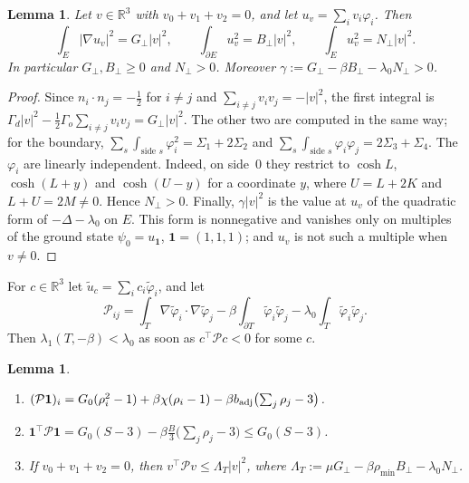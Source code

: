 \documentclass[11pt]{article}
\newtheorem{lemma}[theorem]{Lemma}
\theoremstyle{remark}
\newcommand{\R}{\mathbb{R}}
\newcommand{\E}{E}
\newcommand{\one}{\mathbf 1}
\newcommand{\Gp}{G_{\perp}}
\newcommand{\Bp}{B_{\perp}}
\newcommand{\Np}{N_{\perp}}
\begin{document}
\begin{lemma}\label{lem:vperp}
Let $v\in\R^3$ with $v_0+v_1+v_2=0$, and let $u_v=\sum_iv_i\varphi_i$. Then
\[
  \int_\E|\nabla u_v|^2=\Gp|v|^2,\qquad \int_{\partial\E}u_v^2=\Bp|v|^2,\qquad
  \int_\E u_v^2=\Np|v|^2 .
\]
In particular $\Gp,\Bp\ge0$ and $\Np>0$. Moreover $\gamma:=\Gp-\beta \Bp-\lambda_0\Np>0$.
\end{lemma}

\begin{proof}
Since $n_i\cdot n_j=-\frac12$ for $i\ne j$ and $\sum_{i\ne j}v_iv_j=-|v|^2$, the first integral is
$\Gamma_d|v|^2-\frac12\Gamma_o\sum_{i\neq j}v_iv_j=\Gp|v|^2$. The other two are computed in the same way;
for the boundary, $\sum_s\int_{\text{side }s}\varphi_i^2=\Sigma_1+2\Sigma_2$ and
$\sum_s\int_{\text{side }s}\varphi_i\varphi_j=2\Sigma_3+\Sigma_4$. The $\varphi_i$ are linearly independent.
Indeed, on side~$0$ they restrict to $\cosh L$, $\cosh(L+y)$ and $\cosh(U-y)$ for a coordinate $y$, where
$U=L+2K$ and $L+U=2M\ne0$. Hence $\Np>0$. Finally, $\gamma|v|^2$ is the value at $u_v$ of the quadratic form
of $-\Delta-\lambda_0$ on $\E$. This form is nonnegative and vanishes only on multiples of the ground state
$\psi_0=u_{\one}$, $\one=(1,1,1)$; and $u_v$ is not such a multiple when $v\ne0$.
\end{proof}

For $c\in\R^3$ let $\tilde u_c=\sum_ic_i\tilde\varphi_i$, and let
\[
  \mathcal P_{ij}=\int_T\nabla\tilde\varphi_i\cdot\nabla\tilde\varphi_j
   -\beta\int_{\partial T}\tilde\varphi_i\tilde\varphi_j-\lambda_0\int_T\tilde\varphi_i\tilde\varphi_j .
\]
Then $\lambda_1(T,-\beta)<\lambda_0$ as soon as $c^\top\mathcal Pc<0$ for some $c$.

\begin{lemma}\label{lem:P}
\begin{enumerate}
\item[(a)] $(\mathcal P\one)_i=G_0(\rho_i^2-1)+\beta\chi(\rho_i-1)-\beta b_{\rm adj}\bigl(\sum_j\rho_j-3\bigr)$.
\item[(b)] $\one^\top\mathcal P\one=G_0(S-3)-\beta\frac B3\bigl(\sum_j\rho_j-3\bigr)\le G_0(S-3)$.
\item[(c)] If $v_0+v_1+v_2=0$, then $v^\top\mathcal Pv\le\Lambda_T|v|^2$, where
$\Lambda_T:=\mu \Gp-\beta\rho_{\min}\Bp-\lambda_0\Np$.
\end{enumerate}
\end{lemma}
\end{document}

